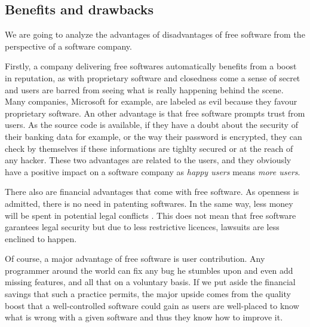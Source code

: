 \documentclass[12pt]{article}
\begin{document}
\subsection{Benefits and drawbacks}

We are going to analyze the advantages of disadvantages of free
software from the perspective of a software company.

Firstly, a company delivering free softwares automatically benefits
from a boost in reputation, as with proprietary software and
closedness come a sense of secret and users are barred from seeing
what is really happening behind the scene. Many companies, Microsoft
for example, are labeled as evil because they favour proprietary
software. An other advantage is that free software prompts trust from
users. As the source code is available, if they have a doubt about the
security of their banking data for example, or the way their password
is encrypted, they can check by themselves if these informations are
tighlty secured or at the reach of any hacker. These two advantages
are related to the users, and they obviously have a positive impact on
a software company as \textit{happy users} means \textit{more users}.

There also are financial advantages that come with free software. As
openness is admitted, there is no need in patenting softwares.  In the
same way, less money will be spent in potential legal conflicts
\cite{afses}. This does not mean that free software garantees legal
security but due to less restrictive licences, lawsuits are less
enclined to happen.

Of course, a major advantage of free software is user
contribution. Any programmer around the world can fix any bug he
stumbles upon and even add missing features, and all that on a
voluntary basis. If we put aside the financial savings that such a
practice permits, the major upside comes from the quality boost that a
well-controlled software could gain as users are well-placed to know
what is wrong with a given software and thus they know how to improve
it.
\end{document}
